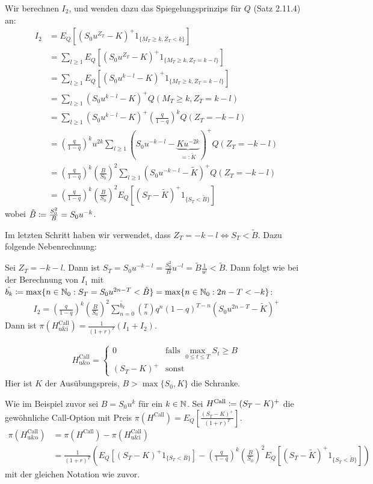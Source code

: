 \documentclass[a4paper,twoside,DIV15,BCOR12mm]{scrbook}
\begin{document}
\begin{beispiel}
Wir berechnen $I_2$, und wenden dazu das Spiegelungsprinzips für $Q$ (Satz 2.11.4) an:
\begin{align*}
I_2&=E_Q[(S_0u^{Z_T}-K)^+1_{\{M_T\geq k,Z_T<k\}}]\\
&= \sum\limits_{l\ge 1}E_Q[(S_0u^{Z_T}-K)^+1_{\{M_T\geq k,Z_T=k-l\}}]\\
&= \sum\limits_{l\ge 1}E_Q[(S_0u^{k-l}-K)^+1_{\{M_T\geq k,Z_T=k-l\}}]\\
&= \sum\limits_{l\ge 1}(S_0u^{k-l}-K)^+Q(M_T\geq k,Z_T=k-l)\\
&= \sum\limits_{l\ge 1}(S_0u^{k-l}-K)^+\left(\frac{q}{1-q}\right)^kQ(Z_T=-k-l)\\
&=\left(\frac{q}{1-q}\right)^ku^{2k}\sum\limits_{l\ge 1}(S_0u^{-k-l}-\underbrace{Ku^{-2k}}_{=:\tilde{K}})^+Q(Z_T=-k-l)\\
&= \left(\frac{q}{1-q}\right)^k\left(\frac{B}{S_0}\right)^{2}\sum\limits_{l\ge 1}(S_0u^{-k-l}-\tilde{K})^+Q(Z_T=-k-l)\\
&=\left(\frac{q}{1-q}\right)^k\left(\frac{B}{S_0}\right)^{2} E_Q[(S_T-\tilde{K})^+1_{\{S_T<\tilde{B}\}}]
\end{align*}
wobei $\tilde{B}\da\frac{S_0^2}{B}=S_0u^{-k}$.

Im letzten Schritt haben wir verwendet, dass $Z_T=-k-l\iff S_T<\tilde{B}$. Dazu folgende Nebenrechnung:

Sei $Z_T=-k-l$. Dann ist $S_T=S_0u^{-k-l}=\frac{S_0^2}{B}u^{-l}=\tilde{B}\frac{1}{u^l}<\tilde{B}$.  Dann folgt wie bei der Berechnung von $I_1$ mit $\tilde{b_k}\da\max\{n\in\MdN_0:S_T=S_0u^{2n-T}<\tilde{B}\}=\max\{n\in\MdN_0:2n-T<-k\}$:
\begin{align*}
I_2=\left(\frac{q}{1-q}\right)^k\left(\frac{B}{S_0}\right)^2 \sum\limits_{n=0}^{\tilde{b_k}} {T\choose n} q^n(1-q)^{T-n} (S_0u^{2n-T}-\tilde{K})^+
\end{align*}
Dann ist $\pi(H_{\text{u\&i}}^{\text{Call}})=\frac{1}{(1+r)^T}(I_1+I_2)$.
\end{beispiel}

\begin{beispiel}
\begin{align*}
H_{\text{u\&o}}^{\text{Call}} = 
\begin{cases}
0 & \text{falls }\max_{0\le t\le T}S_t \ge B \\
(S_T-K)^+ & \text{sonst}
\end{cases}
\end{align*}
Hier ist $K$ der Ausübungspreis, $B>\max\{S_0,K\}$ die Schranke.

Wie im Beispiel zuvor sei $B=S_0u^k$ für ein $k\in\mathbb{N}$.
Sei $H^{\text{Call}}\da(S_T-K)^+$ die gewöhnliche Call-Option mit Preis $\pi(H^{\text{Call}})=E_Q\left[\frac{(S_T-K)^+}{(1+r)^T}\right]$.
\begin{align*}
\pi(H_{\text{u\&o}}^{\text{Call}})&=\pi(H^{\text{Call}})-\pi(H_{\text{u\&i}}^{\text{Call}})\\
&=\frac{1}{(1+r)^T}(E_Q[(S_T-K)^+1_{\{S_T<B\}}]-\left(\frac{q}{1-q}\right)^k\left(\frac{B}{S_0}\right)^2E_Q[(S_T-\tilde{K})^+1_{\{S_T<\tilde{B}\}}])
\end{align*}
mit der gleichen Notation wie zuvor.
\end{beispiel}
\end{document}
